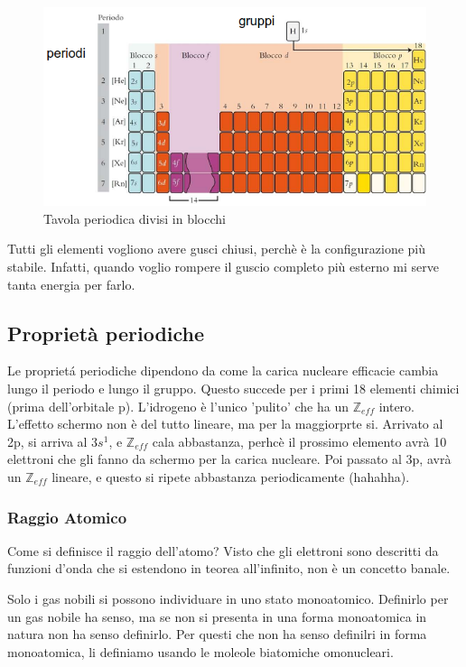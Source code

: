 \documentclass[a4paper]{article}
\begin{document}
\begin{figure}[!ht]
    \centering
    \includegraphics[width=\textwidth]{tavolaperiodicablocchi.png}
    \caption{Tavola periodica divisi in blocchi}
\end{figure}
\FloatBarrier

Tutti gli elementi vogliono avere gusci chiusi, perchè è la configurazione più stabile. Infatti, quando voglio rompere il guscio completo più esterno mi serve tanta energia per farlo. 

\subsection{Proprietà periodiche}
Le proprietá periodiche dipendono da come la carica nucleare efficacie cambia lungo il periodo e lungo il gruppo. Questo succede per i primi 18 elementi chimici (prima dell'orbitale p). L'idrogeno è l'unico 'pulito' che ha un $\mathbb{Z}_{eff}$ intero. L'effetto schermo non è del tutto lineare, ma per la maggiorprte si. Arrivato al 2p, si arriva al $3s^1$, e $\mathbb{Z}_{eff}$ cala abbastanza, perhcè il prossimo elemento avrà 10 elettroni che gli fanno da schermo per la carica nucleare. Poi passato al 3p, avrà un $\mathbb{Z}_{eff}$ lineare, e questo si ripete abbastanza periodicamente (hahahha).

\subsubsection{Raggio Atomico}
Come si definisce il raggio dell'atomo? Visto che gli elettroni sono descritti da funzioni d'onda che si estendono in teorea all'infinito, non è un concetto banale. 

Solo i gas nobili si possono individuare in uno stato monoatomico. Definirlo per un gas nobile ha senso, ma se non si presenta in una forma monoatomica in natura non ha senso definirlo. Per questi che non ha senso definilri in forma monoatomica, li definiamo usando le moleole biatomiche omonucleari.
\end{document}
